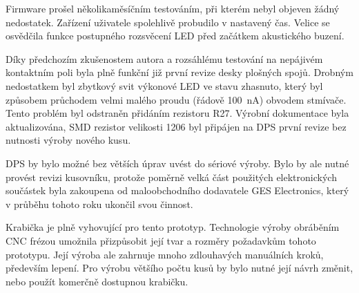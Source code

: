 
Firmware prošel několikaměsíčním testováním, při kterém nebyl objeven žádný
nedostatek. Zařízení uživatele spolehlivě probudilo v nastavený čas. Velice se
osvědčila funkce postupného rozsvěcení LED před začátkem akustického buzení.

Díky předchozím zkušenostem autora a rozsáhlému testování na nepájivém
kontaktním poli byla plně funkční již první revize desky plošných spojů.
Drobným nedostatkem byl zbytkový svit výkonové LED ve stavu zhasnuto, který byl
způsobem průchodem velmi malého proudu (řádově \SI{100}{\nano\ampere}) obvodem
stmívače. Tento problém byl odstraněn přidáním rezistoru R27. Výrobní
dokumentace byla aktualizována, SMD rezistor velikosti 1206 byl připájen na DPS
první revize bez nutnosti výroby nového kusu.

DPS by bylo možné bez větších úprav uvést do sériové výroby. Bylo by ale nutné
provést revizi kusovníku, protože poměrně velká část použitých elektronických
součástek byla zakoupena od maloobchodního dodavatele GES Electronics, který
v průběhu tohoto roku ukončil svou činnost.

Krabička je plně vyhovující pro tento prototyp. Technologie výroby obráběním
CNC frézou umožnila přizpůsobit její tvar a rozměry požadavkům tohoto
prototypu. Její výroba ale zahrnuje mnoho zdlouhavých manuálních kroků,
především lepení. Pro výrobu většího počtu kusů by bylo nutné její návrh
změnit, nebo použít komerčně dostupnou krabičku.
